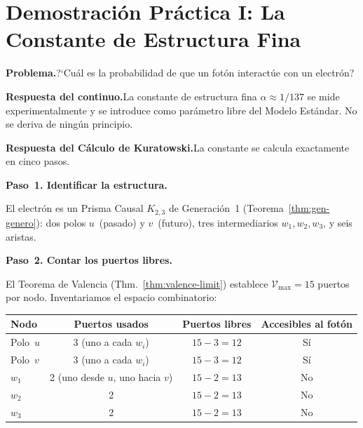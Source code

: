 \documentclass[11pt, a4paper, openany]{book}
\begin{document}
\section*{Demostraci\'on Pr\'actica I: La Constante de Estructura Fina}
\label{sec:demo-alpha}

\noindent\textbf{Problema.}\enspace ?`Cu\'al es la probabilidad de que un
fot\'on interact\'ue con un electr\'on?

\noindent\textbf{Respuesta del continuo.}\enspace La constante de
estructura fina $\alpha \approx 1/137$ se mide experimentalmente y se
introduce como par\'ametro libre del Modelo Est\'andar. No se deriva de
ning\'un principio.

\noindent\textbf{Respuesta del C\'alculo de Kuratowski.}\enspace La
constante se calcula exactamente en cinco pasos.

\bigskip
\noindent
\textbf{Paso~1. Identificar la estructura.}

El electr\'on es un Prisma Causal $K_{2,3}$ de Generaci\'on~1
(Teorema~\ref{thm:gen-genero}): dos polos $u$~(pasado) y $v$~(futuro),
tres intermediarios $w_1, w_2, w_3$, y seis aristas.

\bigskip
\noindent
\textbf{Paso~2. Contar los puertos libres.}

El Teorema de Valencia (Thm.~\ref{thm:valence-limit}) establece
$\mathcal{V}_{\max} = 15$ puertos por nodo. Inventariamos el espacio
combinatorio:

\smallskip
\begin{center}
\renewcommand{\arraystretch}{1.2}
\begin{tabular}{lccc}
\toprule
\textbf{Nodo} & \textbf{Puertos usados} & \textbf{Puertos libres}
  & \textbf{Accesibles al fot\'on} \\
\midrule
Polo~$u$   & 3 (uno a cada $w_i$) & $15 - 3 = 12$ & S\'i \\
Polo~$v$   & 3 (uno a cada $w_i$) & $15 - 3 = 12$ & S\'i \\
$w_1$      & 2 (uno desde $u$, uno hacia $v$) & $15 - 2 = 13$ & No \\
$w_2$      & 2 & $15 - 2 = 13$ & No \\
$w_3$      & 2 & $15 - 2 = 13$ & No \\
\bottomrule
\end{tabular}
\end{center}
\end{document}
